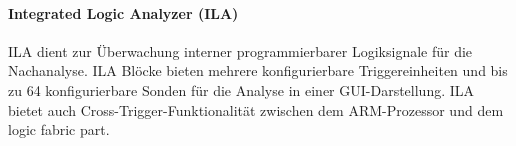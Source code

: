 \paragraph{Integrated Logic Analyzer (ILA)}
ILA dient zur Überwachung interner programmierbarer Logiksignale für die Nachanalyse. ILA Blöcke bieten mehrere konfigurierbare Triggereinheiten und bis zu 64 konfigurierbare Sonden für die Analyse in einer GUI-Darstellung. ILA bietet auch Cross-Trigger-Funktionalität zwischen dem ARM-Prozessor und dem logic fabric part.
